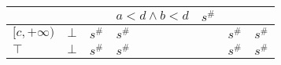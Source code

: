\documentclass{beamer}
\begin{document}
\begin{frame}
\begin{table}[]
{\begin{tabular}{|l|l|ll|ll|ll|l|}
                                        &                         &                          &                                    & $a< d \land b < d$    & $s^\#$                       &                          &                                               &                                                     \\ \hline
        $[c, +\infty)$                  & $\bot$                  & \multicolumn{2}{l|}{$s^\#$}                                   & \multicolumn{2}{l|}{$s^\#$}                          & \multicolumn{2}{l|}{$s^\#$}                                              & $s^\#$                                              \\ \hline
        $\top$                          & $\bot$                  & \multicolumn{2}{l|}{$s^\#$}                                   & \multicolumn{2}{l|}{$s^\#$}                          & \multicolumn{2}{l|}{$s^\#$}                                              & $s^\#$                                              \\ \hline
        \end{tabular}}
        \end{table}
    \end{frame}
    
\end{document}
